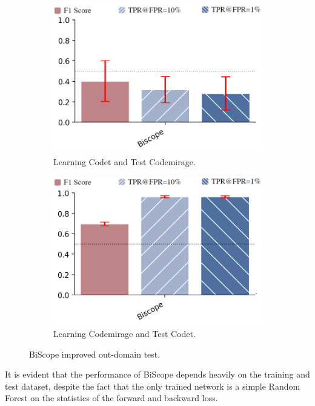 \begin{figure}[H]
    \centering
    \begin{subfigure}[b]{0.45\textwidth}
        \centering
        \includegraphics[width=\linewidth]{img/TEST/BiScope/fromCodetCodemirange/test_noramle_migliorato-Recuperato.png}
        \caption{Learning Codet and Test Codemirage.}
        \label{fig:1}
    \end{subfigure}
    \hfill
    \begin{subfigure}[b]{0.45\textwidth}
        \centering
        \includegraphics[width=\linewidth]{img/TEST/BiScope/fromCodemirageoverCodet/test_noramle_migliorato-Recuperato.png}
        \caption{Learning Codemirage and Test Codet.}
        \label{fig:c2}
    \end{subfigure}
    \caption{BiScope improved out-domain test.}
    \label{fig:111}
\end{figure}
It is evident that the performance of BiScope depends heavily on the 
training and test dataset, despite the fact that the only trained 
network is a simple Random Forest on the statistics of the forward 
and backward loss.

